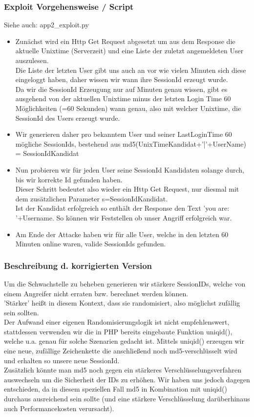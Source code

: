 \documentclass[12pt,a4paper,titlepage,oneside]{scrartcl}
\begin{document}
\subsubsection{Exploit Vorgehensweise / Script}
\noindent
Siehe auch: app2\_exploit.py
\begin{itemize}
\item Zunächst wird ein Http Get Request abgesetzt um aus dem Response die aktuelle Unixtime (Serverzeit) und eine Liste der zuletzt angemeldeten User auszulesen. \\
Die Liste der letzten User gibt uns auch an vor wie vielen Minuten sich diese eingeloggt haben, daher wissen wir wann ihre SessionId erzeugt wurde. \\
Da wir die SessionId Erzeugung nur auf Minuten genau wissen, gibt es ausgehend von der aktuellen Unixtime minus der letzten Login Time 60 Möglichkeiten (=60 Sekunden) wann genau, also mit welcher Unixtime, die SessionId des Users erzeugt wurde.
\item Wir generieren daher pro bekanntem User und seiner LastLoginTime 60 mögliche SessionIds, bestehend aus md5(UnixTimeKandidat+'|'+UserName) = SessionIdKandidat
\item Nun probieren wir für jeden User seine SessionId Kandidaten solange durch, bis wir korrekte Id gefunden haben. \\
Dieser Schritt bedeutet also wieder ein Http Get Request, nur diesmal mit dem zusätzlichen Parameter s=SessionIdKandidat. \\
Ist der Kandidat erfolgreich so enthält der Response den Text 'you are: '+Username. So können wir Feststellen ob unser Angriff erfolgreich war.
\item Am Ende der Attacke haben wir für alle User, welche in den letzten 60 Minuten online waren, valide SessionIds gefunden.
\end{itemize}

\subsubsection{Beschreibung d. korrigierten Version}
\noindent
Um die Schwachstelle zu beheben generieren wir stärkere SessionIDs, welche von einem Angreifer nicht erraten bzw. berechnet werden können. \\
'Stärker' heißt in diesem Kontext, dass sie randomisiert, also möglichst zufällig sein sollten. \\
Der Aufwand einer eigenen Randomisierungslogik ist nicht empfehlenswert, stattdessen verwenden wir die in PHP bereits eingebaute Funktion uniqid(), welche u.a. genau für solche Szenarien gedacht ist. 	Mittels uniqid() erzeugen wir eine neue, zufällige Zeichenkette die anschließend noch md5-verschlüsselt wird und erhalten so unsere neue SessionId. \\
Zusätzlich könnte man md5 noch gegen ein stärkeres Verschlüsselungsverfahren auswechseln um die Sicherheit der IDs zu erhöhen.
Wir haben uns jedoch dagegen entschieden, da in diesem speziellen Fall md5 in Kombination mit uniqid() durchaus ausreichend sein sollte 
(und eine stärkere Verschlüsselung darüberhinaus auch Performancekosten verursacht).
\end{document}
